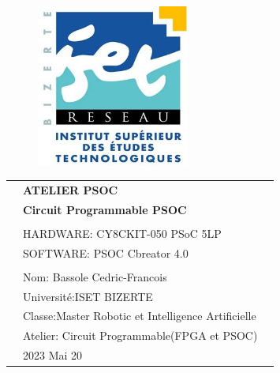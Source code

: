 \begin{center}

    \vspace*{1cm}
    
    \begin{figure}
      \raggedleft
      \begin{minipage}{4cm}
      \includegraphics[width=5cm]{images/logo-isetbz.png}
      \end{minipage}
    \end{figure}
    
    \vspace*{2cm}
    
    \vspace*{0.1in}
    
    \begin{spacing}{1.7}
    
    \begin{tabular}{p{4cm} ll}
    
    & \textbf{\huge ATELIER PSOC}\\ %
    & \textbf{\Large Circuit Programmable PSOC}\\ %
    & \\
    & \large HARDWARE: CY8CKIT-050 PSoC 5LP \\
    & \large SOFTWARE: PSOC Cbreator 4.0   \\ 
    
    & \\
    & \large Nom: Bassole Cedric-Francois\\
    & \large Université:ISET BIZERTE \\
    & \large Classe:Master Robotic et Intelligence Artificielle \\
    & \large Atelier: Circuit Programmable(FPGA et PSOC)\\
    & \large 2023  Mai 20
    \end{tabular}
    
    \end{spacing}
    
    \end{center}
    
    
    
    \thispagestyle{empty} %
    \clearpage\setcounter{page}{1} %
